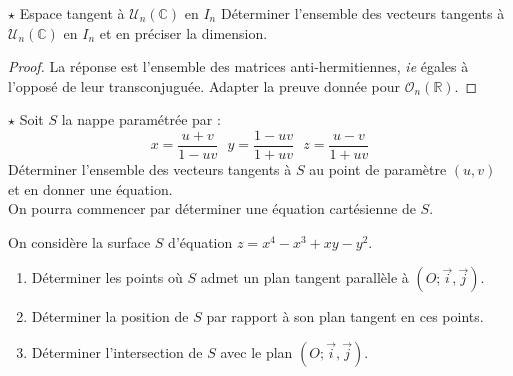 \documentclass[french,a4paper]{article}
\newcommand{\R}{\mathbb{R}}
\newcommand{\C}{\mathbb{C}}
\theoremstyle{plain}
\theoremstyle{definition}
\theoremstyle{remark}
\begin{document}
\begin{ex}[Moulin.CD.67]{$\star$ Espace tangent à $\mathcal{U}_n(\C)$ en $I_n$}
	Déterminer l'ensemble des vecteurs tangents à $\mathcal{U}_n(\C)$ en $I_n$ et en préciser la dimension.
\end{ex}
\begin{proof}
	La réponse est l'ensemble des matrices anti-hermitiennes, \textit{ie} égales à l'opposé de leur transconjuguée. Adapter la preuve donnée pour $\mathcal{O}_n(\R)$.
\end{proof}

\begin{ex}[Moulin.CD.68]{$\star$}
	Soit $S$ la nappe paramétrée par : $$x=\frac{u+v}{1-uv}\ \ \ y=\frac{1-uv}{1+uv}\ \ \ z=\frac{u-v}{1+uv}$$ Déterminer l'ensemble des vecteurs tangents à $S$ au point de paramètre $(u,v)$ et en donner une équation. \\
	On pourra commencer par déterminer une équation cartésienne de $S$.
\end{ex}

\begin{ex}[Moulin.CD.69]{}
	On considère la surface $S$ d'équation $z=x^4-x^3+xy-y^2$.
	\begin{enumerate}
		\item Déterminer les points où $S$ admet un plan tangent parallèle à $(O;\overrightarrow{i},\overrightarrow{j})$.
		\item Déterminer la position de $S$ par rapport à son plan tangent en ces points.
		\item Déterminer l'intersection de $S$ avec le plan $(O;\overrightarrow{i},\overrightarrow{j})$.
	\end{enumerate}
\end{ex}
\end{document}
